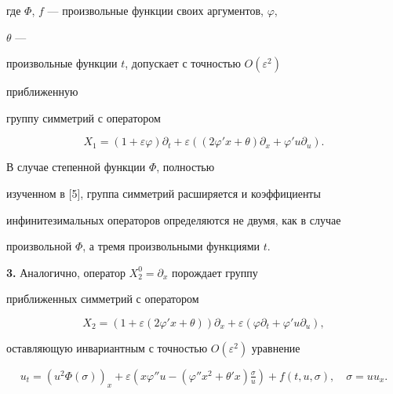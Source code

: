 где $\Phi$, $f$ --- произвольные функции своих аргументов, $\varphi$, 


$\theta$ --- 


произвольные функции $t$, допускает с точностью $O(\varepsilon^2)$ 


приближенную 


группу симметрий с оператором 


\begin{equation} 


X_1=(1+\varepsilon\varphi)\partial_t+ 


\varepsilon((2\varphi'x+\theta)\partial_x+ 


\varphi'u\partial_u).\tag{2.18} 


\end{equation} 


 


\begin{notenonum} 


В случае степенной функции $\Phi$, полностью 


изученном в [5], группа симметрий расширяется и коэффициенты 


инфинитезимальных операторов определяются не двумя, как в случае 


произвольной $\Phi$, а тремя произвольными функциями $t$. 


\end{notenonum} 


 


{\bf 3.} Аналогично, оператор $X^0_2=\partial_x$ порождает группу 


приближенных симметрий с оператором 


\begin{equation} 


X_2=(1+\varepsilon(2\varphi'x+\theta))\partial_x+ 


\varepsilon(\varphi\partial_t+\varphi'u\partial_u),\tag{3.1} 


\end{equation} 


оставляющую инвариантным с точностью $O(\varepsilon^2)$ уравнение 


\begin{equation} 


u_t=(u^2\Phi(\sigma))_x+\varepsilon 


(x\varphi''u-(\varphi''x^2+\theta'x)\tfrac{\sigma}{u})+ 


f(t,u,\sigma),\quad \sigma=u u_x.\tag{3.2} 


\end{equation} 


